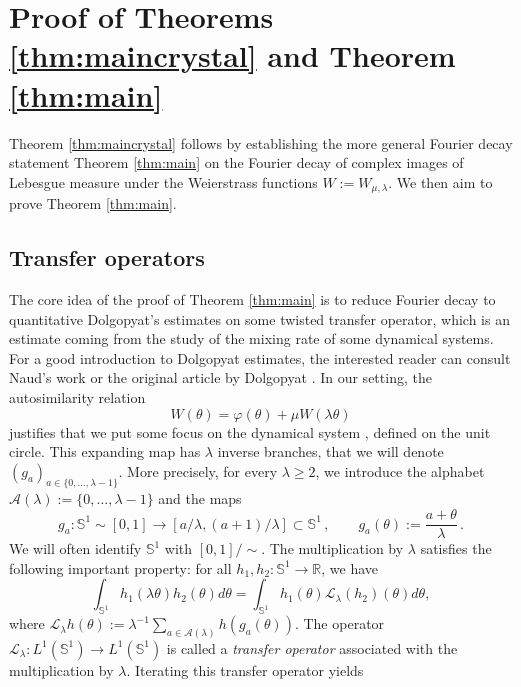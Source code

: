 \documentclass[11pt]{amsart}
\theoremstyle{plain}
\theoremstyle{definition}
\numberwithin{equation}{section}
\begin{document}
\section{Proof of Theorems \ref{thm:maincrystal} and Theorem \ref{thm:main}} \label{sec:mainproof}

Theorem \ref{thm:maincrystal} follows by establishing the more general Fourier decay statement Theorem \ref{thm:main} on the Fourier decay of complex images of Lebesgue measure under the Weierstrass functions $W := W_{\mu,\lambda}$. We then aim to prove Theorem \ref{thm:main}.

\subsection{Transfer operators}\label{sec:tran}

The core idea of the proof of Theorem \ref{thm:main} is to reduce Fourier decay to quantitative Dolgopyat's estimates on some twisted transfer operator, which is an estimate coming from the study of the mixing rate of some dynamical systems. For a good introduction to Dolgopyat estimates, the interested reader can consult Naud's work \cite{Na05} or the original article by Dolgopyat \cite{Do98}. In our setting, the autosimilarity relation 
$$W(\theta) = \varphi(\theta)+\mu W(\lambda \theta)$$ 
justifies that we put some focus on the dynamical system , defined on the unit circle. This expanding map has $\lambda$ inverse branches, that we will denote $(g_a)_{a \in \{ 0,\dots, \lambda-1 \}}$. More precisely, for every $\lambda \geq 2$, we introduce the alphabet $\mathcal{A}(\lambda) := \{0,\dots,\lambda-1\}$ and the maps 
\[
g_a: \mathbb{S}^1 \sim [0,1] \rightarrow [a/\lambda,(a+1)/\lambda] \subset \mathbb{S}^1\,, \qquad  g_a(\theta) := \frac{a+\theta}{\lambda}\,.
\]
We will often identify $\mathbb{S}^1$ with $[0,1]/\sim$. The multiplication by $\lambda$ satisfies the following important property: for all $h_1,h_2:\mathbb{S}^1\rightarrow \mathbb{R}$, we have
$$ \int_{\mathbb{S}^1} h_1(\lambda \theta) h_2(\theta) d\theta = \int_{\mathbb{S}^1} h_1(\theta) \mathcal{L}_{\lambda}(h_2)(\theta) d\theta ,$$
where $\mathcal{L}_\lambda h(\theta) := \lambda^{-1} \sum_{a \in \mathcal{A}(\lambda)} h(g_a(\theta))$. The operator $\mathcal{L}_\lambda : L^1(\mathbb{S}^1) \rightarrow L^1(\mathbb{S}^1)$ is called a \textit{transfer operator} associated with the multiplication by $\lambda$. Iterating this transfer operator yields
\end{document}
